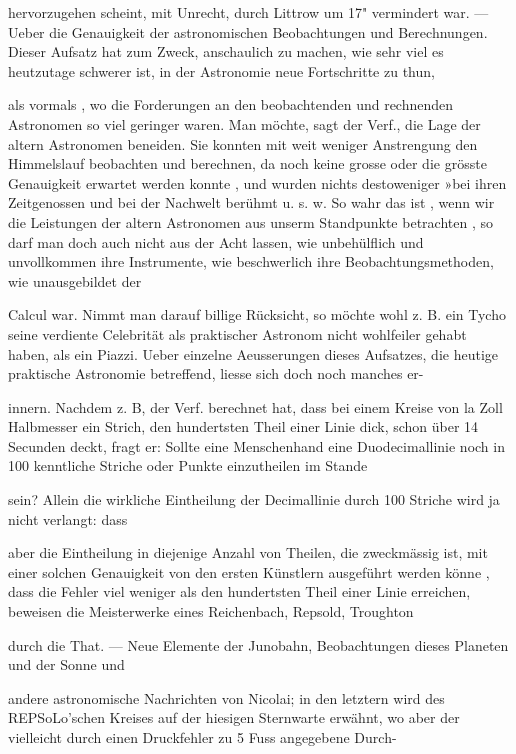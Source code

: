 \documentclass[10pt,a4paper]{article}
\begin{document}
hervorzugehen scheint, mit Unrecht, durch Littrow um 17" vermindert war. — Ueber die Genauigkeit der astronomischen Beobachtungen und Berechnungen. Dieser Aufsatz hat zum Zweck, anschaulich zu machen, wie sehr viel es heutzutage schwerer ist, in der Astronomie neue Fortschritte zu thun,

als vormals , wo die Forderungen an den beobachtenden und rechnenden Astronomen so viel geringer waren. Man möchte, sagt der Verf., die Lage der altern Astronomen beneiden. Sie konnten mit weit weniger Anstrengung den Himmelslauf beobachten und berechnen, da noch keine grosse oder die grösste Genauigkeit erwartet werden konnte , und wurden nichts destoweniger »bei ihren Zeitgenossen und bei der Nachwelt berühmt u. s. w. So wahr das ist , wenn wir die Leistungen der altern Astronomen aus unserm Standpunkte betrachten , so darf man doch auch nicht aus der Acht lassen, wie unbehülflich und unvollkommen ihre Instrumente, wie beschwerlich ihre Beobachtungsmethoden, wie unausgebildet der

Calcul war. Nimmt man darauf billige Rücksicht, so möchte wohl z. B. ein Tycho seine verdiente Celebrität als praktischer Astronom nicht wohlfeiler gehabt haben, als ein Piazzi. Ueber einzelne Aeusserungen dieses Aufsatzes, die heutige praktische Astronomie betreffend, liesse sich doch noch manches er-

innern. Nachdem z. B, der Verf. berechnet hat, dass bei einem Kreise von la Zoll Halbmesser ein Strich, den hundertsten Theil einer Linie dick, schon über 14 Secunden deckt, fragt er: Sollte eine Menschenhand eine Duodecimallinie noch in 100 kenntliche Striche oder Punkte einzutheilen im Stande

sein? Allein die wirkliche Eintheilung der Decimallinie durch 100 Striche wird ja nicht verlangt: dass

aber die Eintheilung in diejenige Anzahl von Theilen, die zweckmässig ist, mit einer solchen Genauigkeit von den ersten Künstlern ausgeführt werden könne , dass die Fehler viel weniger als den hundertsten Theil einer Linie erreichen, beweisen die Meisterwerke eines Reichenbach, Repsold, Troughton

durch die That. — Neue Elemente der Junobahn, Beobachtungen dieses Planeten und der Sonne und

andere astronomische Nachrichten von Nicolai; in den letztern wird des REPSoLo'schen Kreises auf der hiesigen Sternwarte erwähnt, wo aber der vielleicht durch einen Druckfehler zu 5 Fuss angegebene Durch-
\end{document}
